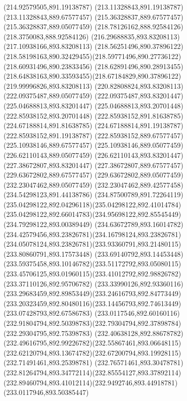 {{	\lineto(214.92579505,891.19138787)
	\lineto(213.11328843,891.19138787)
	\lineto(213.11328843,889.67577457)
	\lineto(215.36328837,889.67577457)
	\lineto(215.36328837,889.05077459)
	\closepath
	\moveto(218.78126162,888.92584126)
	\lineto(218.3750083,888.92584126)
	\lineto(216.29688835,893.83208113)
	\lineto(217.10938166,893.83208113)
	\lineto(218.56251496,890.37896122)
	\curveto(218.58198163,890.32429455)(218.59771496,890.27736122)(218.60931496,890.23833456)
	\curveto(218.62891496,890.28913455)(218.64838163,890.33593455)(218.67184829,890.37896122)
	\lineto(219.99996826,893.83208113)
	\lineto(220.82808824,893.83208113)
	\closepath
	\moveto(222.09375487,889.05077459)
	\lineto(222.09375487,893.83201447)
	\lineto(225.04688813,893.83201447)
	\lineto(225.04688813,893.20701448)
	\lineto(222.85938152,893.20701448)
	\lineto(222.85938152,891.81638785)
	\lineto(224.67188814,891.81638785)
	\lineto(224.67188814,891.19138787)
	\lineto(222.85938152,891.19138787)
	\lineto(222.85938152,889.67577457)
	\lineto(225.10938146,889.67577457)
	\lineto(225.10938146,889.05077459)
	\closepath
	\moveto(226.62110143,889.05077459)
	\lineto(226.62110143,893.83201447)
	\lineto(227.38672807,893.83201447)
	\lineto(227.38672807,889.67577457)
	\lineto(229.63672802,889.67577457)
	\lineto(229.63672802,889.05077459)
	\closepath
	\moveto(232.23047462,889.05077459)
	\lineto(232.23047462,889.42577458)
	\lineto(234.54298123,891.44138786)
	\curveto(234.87500789,891.72264119)(235.04298122,892.04296118)(235.04298122,892.41014784)
	\curveto(235.04298122,892.66014783)(234.95698122,892.85545449)(234.79298122,893.00389449)
	\curveto(234.63672789,893.16014782)(234.42579456,893.23826781)(234.16798124,893.23826781)
	\curveto(234.05078124,893.23826781)(233.93360791,893.21480115)(233.80860791,893.17573448)
	\curveto(233.69140792,893.14453448)(233.59375458,893.10146782)(233.51172792,893.05080115)
	\curveto(233.45706125,893.01960115)(233.41012792,892.98826782)(233.37110126,892.95706782)
	\curveto(233.33990126,892.93360116)(233.29683459,892.89853449)(233.24616793,892.84773449)
	\curveto(233.20323459,892.80480116)(233.14456793,892.74613449)(233.07428793,892.67586783)
	\curveto(233.0117546,892.60160116)(232.91804794,892.50398783)(232.79304794,892.37898784)
	\lineto(232.29304795,892.75398783)
	\curveto(232.40638128,892.88678782)(232.49616795,892.99226782)(232.55867461,893.06648115)
	\curveto(232.62120794,893.13674782)(232.67200794,893.19928115)(232.71491461,893.25398781)
	\curveto(232.76571461,893.30478781)(232.81264794,893.34772114)(232.85554127,893.37892114)
	\curveto(232.89460794,893.41012114)(232.9492746,893.44918781)(233.0117946,893.50385447)
}}
